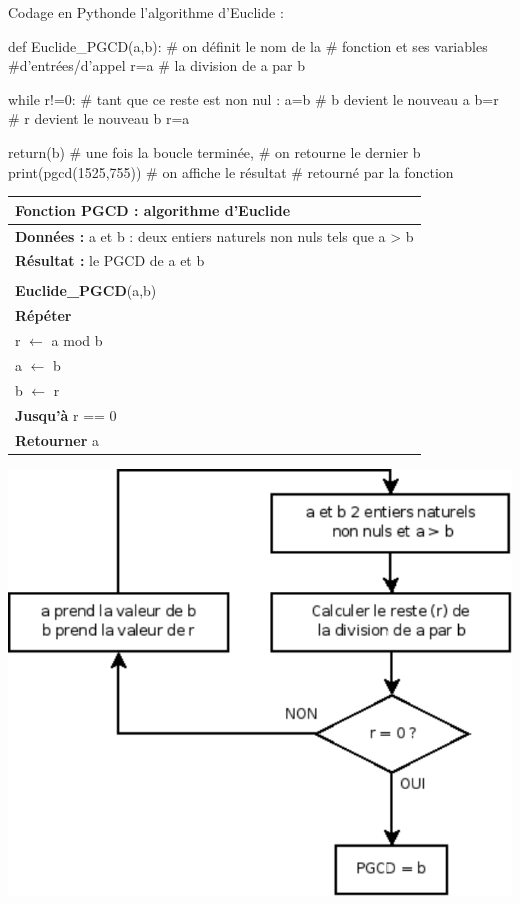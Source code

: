 \documentclass[10pt]{article}
\begin{document}
\begin{minipage}[c]{.48\linewidth}
\begin{py}
Codage en Pythonde l'algorithme d'Euclide :
\begin{python}
def Euclide_PGCD(a,b):	# on définit le nom de la 
			# fonction et ses variables 
			#d'entrées/d'appel
    r=a%
			# la division de a par b
    
    while r!=0:		# tant que ce reste est non nul :
        a=b		# b devient le nouveau a
        b=r		# r devient le nouveau b
        r=a%
        
    return(b)		# une fois la boucle terminée, 
			# on retourne le dernier b    
print(pgcd(1525,755))	# on affiche le résultat 
			# retourné par la fonction
\end{python}
\end{py}
\end{minipage}\hfill
\begin{minipage}[c]{.48\linewidth}
\begin{pseudo}
\begin{tabular}{p{}}
\hline
Fonction PGCD : algorithme d’Euclide \\
\hline
\textbf{Données :} a et b : deux entiers naturels non nuls tels que a > b \\
\textbf{Résultat :} le PGCD de a et b \\
\\
\textbf{Euclide\_PGCD}(a,b) \\
\hspace{.5cm}\textbf{Répéter}\\
\hspace{1cm}r $\leftarrow$ a mod b\\
\hspace{1cm}a $\leftarrow$ b \\
\hspace{1cm}b $\leftarrow$ r \\
\hspace{.5cm}\textbf{Jusqu’à} r == 0 \\
\hspace{.5cm}\textbf{Retourner} a\\
\hline
\end{tabular}
\end{pseudo}
\end{minipage}

\begin{center}
\includegraphics[width=.45\textwidth]{images/algo_euclide}
\end{center}
\end{document}

